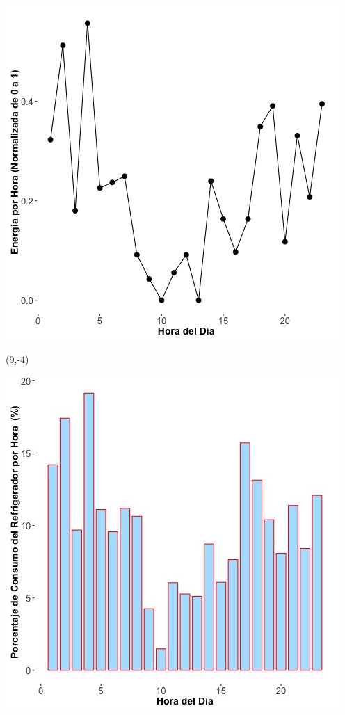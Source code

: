 \documentclass{article}\usepackage[]{graphicx}\usepackage[]{color}
\newenvironment{knitrout}{}{} %
\begin{document}
\begin{knitrout}
\color{fgcolor}
\includegraphics[scale=0.75]{figure/A3_fplot_norm_median} 
\end{knitrout}


 \begin{textblock}{1}(9,-4)
\begin{minipage}{20em}
\begingroup

\endgroup
\end{minipage}
\end{textblock}

 \vspace{2cm}

\begin{knitrout}
\color{fgcolor}
\includegraphics[scale=0.65]{figure/A3_fridge_energy_pct.jpg} 
\end{knitrout}
\end{document}
